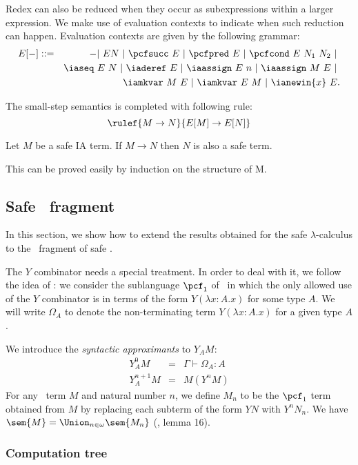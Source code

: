 Redex can also be reduced when they occur as subexpressions within a
larger expression. We make use of evaluation contexts to indicate
when such reduction can happen. Evaluation contexts are given by the
following grammar:
\begin{eqnarray*}
E[-] &::=& - |\ E N\ |\ \pcfsucc\ E\ |\ \pcfpred\ E\ |\ \pcfcond\ E\ N_1\ N_2\ |\ \\
&&    \iaseq\ E\ N\ |\ \iaderef\ E\ |\ \iaassign\ E\ n\ |\ \iaassign\ M\ E \ |\ \\
&&    \iamkvar\ M\ E\ |\ \iamkvar\ E\ M\ |\ \ianewin{x}\ E  .
\end{eqnarray*}

The small-step semantics is completed with following rule:
$$ \rulef{M \rightarrow N}{E[M] \rightarrow E[N]} $$

\begin{lemma}
\label{lem:ia_safety_preserved} Let $M$ be a safe IA term. If
$M \rightarrow N$ then $N$ is also a safe term.
\end{lemma}
This can be proved easily by induction on the structure of M.


\subsection{Safe \pcf\ fragment}
In this section, we show how to extend the results obtained for the
safe $\lambda$-calculus to the \pcf\ fragment of safe \ialgol.

The $Y$ combinator needs a special treatment. In order to deal with
it, we follow the idea of \cite{abramsky:game-semantics-tutorial}:
we consider the sublanguage $\pcf_1$ of \pcf\ in which the only
allowed use of the $Y$ combinator is in terms of the form $Y(
\lambda x:A .x )$ for some type $A$. We will write $\Omega_A$ to
denote the non-terminating term $Y(\lambda x:A .x)$ for a given type
$A$.

We introduce the \emph{syntactic approximants} to $Y_A M$:
\begin{eqnarray*}
Y^0_A M &=& \Gamma \vdash \Omega_A : A\\
Y^{n+1}_A M &=& M( Y^n M )
\end{eqnarray*}
For any \pcf\ term $M$ and natural number $n$, we define $M_n$ to be
the $\pcf_1$ term obtained from $M$ by replacing each subterm of the
form $Y N$ with $Y^n N_n$. We have $\sem{M} = \Union_{n\in\omega}
\sem{M_n}$ (\cite{abramsky:game-semantics-tutorial}, lemma 16).


\subsubsection{Computation tree}

